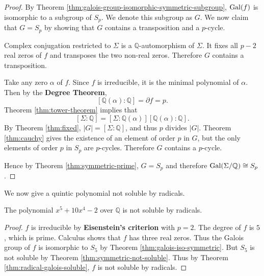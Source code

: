 \begin{proof}
	By Theorem \ref{thm:galois-group-isomorphic-symmetric-subgroup}, $\operatorname{Gal}(f)$ is isomorphic to a subgroup of $S_p$. We denote this subgroup as $G$. We now claim that $G = S_p$ by showing that $G$ contains a transposition and a $p$-cycle.

    Complex conjugation restricted to $\Sigma$ is a $\mathbb Q$-automorphism of $\Sigma$. It fixes all $p - 2$ real zeros of $f$ and transposes the two non-real zeros. Therefore $G$ contains a transposition. 

    Take any zero $\alpha$ of $f$. Since $f$ is irreducible, it is the minimal polynomial of $\alpha$. Then by the \textbf{Degree Theorem}, $$[\mathbb Q(\alpha) : \mathbb Q] = \partial f = p. $$ Theorem \ref{thm:tower-theorem} implies that $$[\Sigma : \mathbb Q] = [\Sigma : \mathbb Q(\alpha)] [ \mathbb Q(\alpha) : \mathbb Q]. $$ By Theorem \ref{thm:fixed}, $|G| = [\Sigma : \mathbb Q]$, and thus $p$ divides $|G|$. Theorem \ref{thm:cauchy} gives the existence of an element of order $p$ in $G$, but the only elements of order $p$ in $S_p$ are $p$-cycles. Therefore $G$ contains a $p$-cycle.

    Hence by Theorem \ref{thm:symmetric-prime}, $ G = S_p$ and therefore $\operatorname{Gal}(\Sigma / \mathbb Q) \cong S_p$.
\end{proof}

We now give a quintic polynomial not soluble by radicals. 

\begin{example}
    The polynomial $x^5 + 10 x^4 - 2$ over $\mathbb Q$ is not soluble by radicals.
\end{example}

\begin{proof}
    $f$ is irreducible by \textbf{Eisenstein's criterion} with $p = 2$. The degree of $f$ is $5$, which is prime. Calculus shows that $f$ has three real zeros. Thus the Galois group of $f$ is isomorphic to $S_5$ by Theorem \ref{thm:galois-iso-symmetric}. But $S_5$ is not soluble by Theorem \ref{thm:symmetric-not-soluble}. Thus by Theorem \ref{thm:radical-galois-soluble}, $f$ is not soluble by radicals.
\end{proof}

